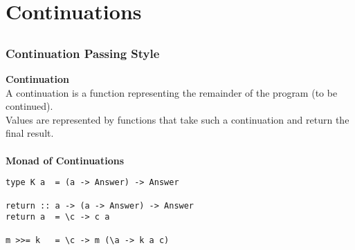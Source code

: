 \documentclass{beamer}
\begin{document}

\section{Continuations}
\subsection{} 
\begin{frame}[fragile]
\frametitle{Continuation Passing Style}

\textbf{Continuation}\\
A continuation is a function representing the remainder of the program (to be continued). \\
Values are represented by functions that take such a continuation and return the final result. \\\ \\ 

\textbf{Monad of Continuations}
\begin{lstlisting}
type K a  = (a -> Answer) -> Answer

return :: a -> (a -> Answer) -> Answer
return a  = \c -> c a

m >>= k   = \c -> m (\a -> k a c)
\end{lstlisting}

 
 
\end{frame}
\end{document}
